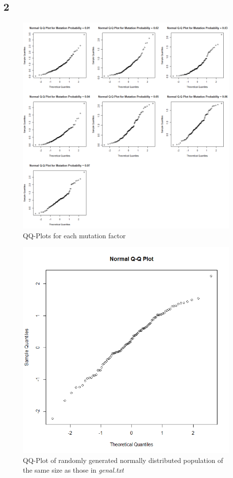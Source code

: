 \documentclass{article}
\begin{document}
    \subsection*{2}
    
    \begin{figure}[!htb]
      \includegraphics[scale=0.4]{../results/3_2_1.png}
      \caption{QQ-Plots for each mutation factor}
      \label{fig:qq-genal}
    \end{figure}
    
    \begin{figure}[!htb]
    \centering
      \includegraphics[scale=0.3]{../results/3_2_2.png}
      \caption{QQ-Plot of randomly generated normally distributed population of the same size as those in \textit{genal.txt}}
      \label{fig:qq-nrml}
    \end{figure}
    
\end{document}
